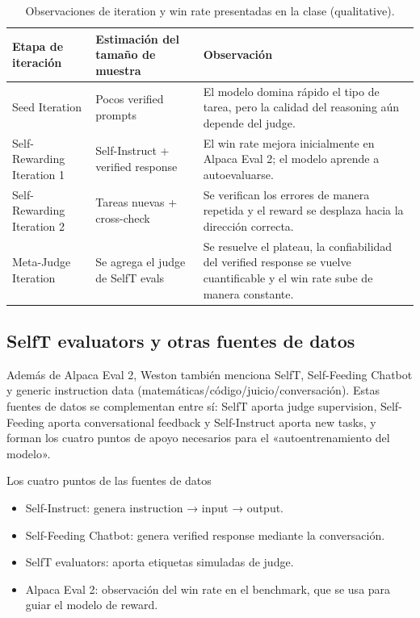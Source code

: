 \documentclass[a4paper]{article}
\begin{document}
\begin{table}[H]
\centering
\begin{tabular}{p{4cm}p{4cm}p{7cm}}
\toprule
Etapa de iteración & Estimación del tamaño de muestra & Observación \\
\midrule
Seed Iteration & Pocos verified prompts & El modelo domina rápido el tipo de tarea, pero la calidad del reasoning aún depende del judge. \\
Self-Rewarding Iteration 1 & Self-Instruct + verified response & El win rate mejora inicialmente en Alpaca Eval 2; el modelo aprende a autoevaluarse. \\
Self-Rewarding Iteration 2 & Tareas nuevas + cross-check & Se verifican los errores de manera repetida y el reward se desplaza hacia la dirección correcta. \\
Meta-Judge Iteration & Se agrega el judge de SelfT evals & Se resuelve el plateau, la confiabilidad del verified response se vuelve cuantificable y el win rate sube de manera constante. \\
\bottomrule
\end{tabular}
\caption{Observaciones de iteration y win rate presentadas en la clase (qualitative).}
\end{table}

\subsection{SelfT evaluators y otras fuentes de datos}
Además de Alpaca Eval 2, Weston también menciona SelfT, Self-Feeding Chatbot y generic instruction data (matemáticas/código/juicio/conversación). Estas fuentes de datos se complementan entre sí: SelfT aporta judge supervision, Self-Feeding aporta conversational feedback y Self-Instruct aporta new tasks, y forman los cuatro puntos de apoyo necesarios para el «autoentrenamiento del modelo».

\begin{importantbox}{Los cuatro puntos de las fuentes de datos}
\begin{itemize}
    \item Self-Instruct: genera instruction → input → output.
    \item Self-Feeding Chatbot: genera verified response mediante la conversación.
    \item SelfT evaluators: aporta etiquetas simuladas de judge.
    \item Alpaca Eval 2: observación del win rate en el benchmark, que se usa para guiar el modelo de reward.
\end{itemize}
\end{importantbox}
\end{document}
